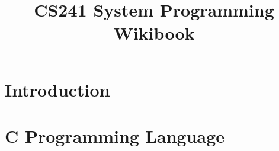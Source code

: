 \documentclass[hidelinks]{book}
\title{\vspace{-15mm}\fontsize{24pt}{10pt}\selectfont\textbf{CS241 System Programming Wikibook}}
\date{}
\newcommand{\inputchapter}[2]{\chapter{#2}}
\begin{document}
\pagestyle{fancy}
\fancyhf{}
\setcounter{secnumdepth}{1}
\setcounter{tocdepth}{1}

\maketitle

\tableofcontents

\inputchapter{introduction/introduction.tex}{Introduction}
\inputchapter{introc/introc.tex}{C Programming Language}

\printglossaries
\end{document}
